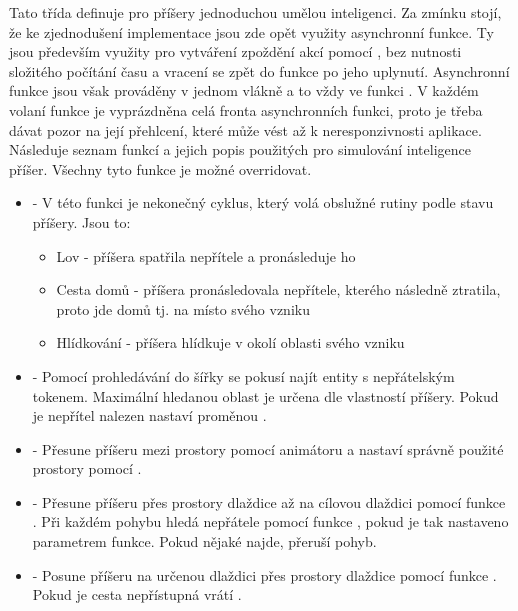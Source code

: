 Tato třída definuje pro příšery jednoduchou umělou inteligenci. Za zmínku stojí, že ke zjednodušení implementace jsou zde opět využity 
asynchronní funkce. Ty jsou především využity pro vytváření zpoždění akcí pomocí , bez nutnosti složitého počítání času a vracení se zpět
do funkce po jeho uplynutí. Asynchronní funkce jsou však prováděny v jednom vlákně a to vždy ve funkci . V každém volaní funkce
je vyprázdněna celá fronta asynchronních funkci, proto je třeba dávat pozor na její přehlcení, které může vést až k neresponzivnosti aplikace.
Následuje seznam funkcí a jejich popis použitých pro simulování inteligence příšer. Všechny tyto funkce je možné overridovat.
\begin{itemize}

\item {} - V této funkci je nekonečný cyklus, který volá obslužné rutiny podle stavu příšery. Jsou to:
	\begin{itemize}
    \item Lov - příšera spatřila nepřítele a pronásleduje ho 
    \item Cesta domů - příšera pronásledovala nepřítele, kterého následně ztratila, proto jde domů tj. na místo svého vzniku
    \item Hlídkování - příšera hlídkuje v okolí oblasti svého vzniku
	\end{itemize}

\item {} - Pomocí prohledávání do šířky se pokusí najít entity s nepřátelským tokenem. Maximální hledanou oblast
je určena dle vlastností příšery. Pokud je nepřítel nalezen nastaví proměnou .

\item {} - Přesune příšeru mezi prostory pomocí animátoru a nastaví správně použité prostory pomocí .

\item {} - Přesune příšeru přes prostory dlaždice až na cílovou dlaždici pomocí funkce . Při každém pohybu hledá nepřátele
pomocí funkce , pokud je tak nastaveno parametrem funkce. Pokud nějaké najde, přeruší pohyb.

\item {} - Posune příšeru na určenou dlaždici přes prostory dlaždice pomocí funkce .
 Pokud je cesta nepřístupná vrátí .


\end{itemize}
